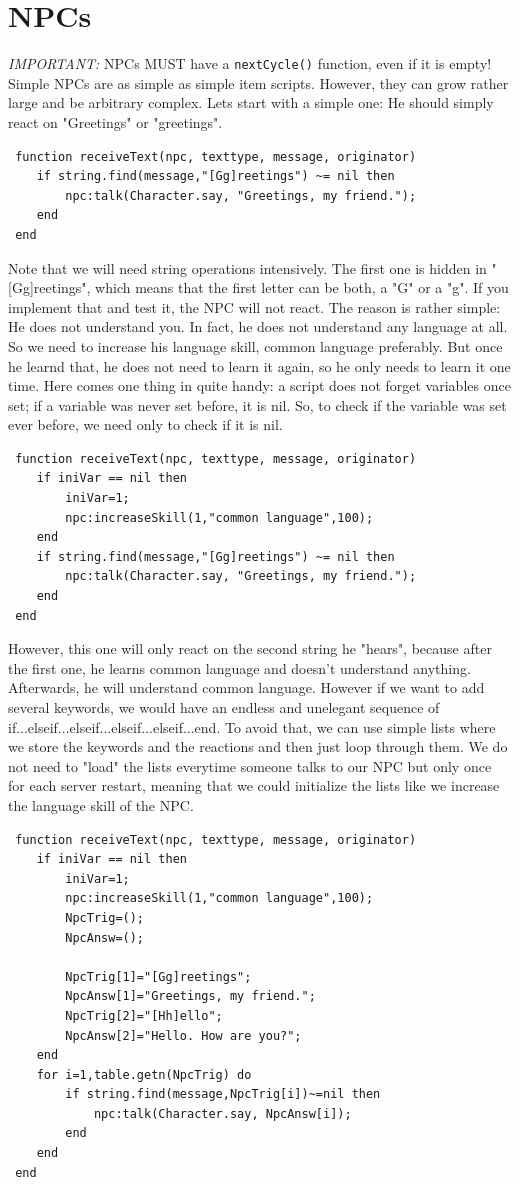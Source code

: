 \documentclass[a4paper,10pt,makeidx]{scrreprt}
\newcommand{\comm}[1]{\index{#1}\texttt{#1}}
\begin{document}
\section{NPCs}
\emph{IMPORTANT:} NPCs MUST have a \comm{nextCycle()} function, even if it is empty!\\
Simple NPCs are as simple as simple item scripts. However, they can grow rather large and be arbitrary complex. Lets start with a simple one: He should simply react on "Greetings" or "greetings".
\begin{verbatim}
 function receiveText(npc, texttype, message, originator)
    if string.find(message,"[Gg]reetings") ~= nil then
        npc:talk(Character.say, "Greetings, my friend.");
    end
 end
 \end{verbatim}
Note that we will need string operations intensively. The first one is hidden in "[Gg]reetings", which means that the first letter can be both, a "G" or a "g".
If you implement that and test it, the NPC will not react. The reason is rather simple: He does not understand you. In fact, he does not understand any language at all. So we need to increase his language skill, common language preferably. But once he learnd that, he does not need to learn it again, so he only needs to learn it one time. Here comes one thing in quite handy: a script does not forget variables once set; if a variable was never set before, it is nil. So, to check if the variable was set ever before, we need only to check if it is nil.
\begin{verbatim}
 function receiveText(npc, texttype, message, originator)
    if iniVar == nil then
        iniVar=1;
        npc:increaseSkill(1,"common language",100);
    end
    if string.find(message,"[Gg]reetings") ~= nil then
        npc:talk(Character.say, "Greetings, my friend.");
    end
 end
 \end{verbatim}
However, this one will only react on the second string he "hears", because after the first one, he learns common language and doesn't understand anything. Afterwards, he will understand common language.
However if we want to add several keywords, we would have an endless and unelegant sequence of if...elseif...elseif...elseif...elseif...end. To avoid that, we can use simple lists where we store the keywords and the reactions and then just loop through them. We do not need to "load" the lists everytime someone talks to our NPC but only once for each server restart, meaning that we could initialize the lists like we increase the language skill of the NPC.
\begin{verbatim}
 function receiveText(npc, texttype, message, originator)
    if iniVar == nil then
        iniVar=1;
        npc:increaseSkill(1,"common language",100);
        NpcTrig=();
        NpcAnsw=();

        NpcTrig[1]="[Gg]reetings";
        NpcAnsw[1]="Greetings, my friend.";
        NpcTrig[2]="[Hh]ello";
        NpcAnsw[2]="Hello. How are you?";
    end
    for i=1,table.getn(NpcTrig) do
        if string.find(message,NpcTrig[i])~=nil then
            npc:talk(Character.say, NpcAnsw[i]);
        end
    end
 end
 \end{verbatim}
\end{document}

